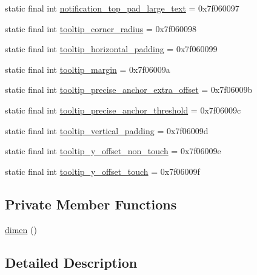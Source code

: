 \begin{DoxyCompactItemize}
\item 
static final int \mbox{\hyperlink{classandroid_1_1support_1_1design_1_1_r_1_1dimen_ae304902fc92fe38e50921433885f488b}{notification\+\_\+top\+\_\+pad\+\_\+large\+\_\+text}} = 0x7f060097
\item 
static final int \mbox{\hyperlink{classandroid_1_1support_1_1design_1_1_r_1_1dimen_a820af68fce1d51144ee651d2b4745161}{tooltip\+\_\+corner\+\_\+radius}} = 0x7f060098
\item 
static final int \mbox{\hyperlink{classandroid_1_1support_1_1design_1_1_r_1_1dimen_a2d5d1251e5fb4877c055140780ccf655}{tooltip\+\_\+horizontal\+\_\+padding}} = 0x7f060099
\item 
static final int \mbox{\hyperlink{classandroid_1_1support_1_1design_1_1_r_1_1dimen_a455cff6e6f3708ce927b07b2aa8fa4b3}{tooltip\+\_\+margin}} = 0x7f06009a
\item 
static final int \mbox{\hyperlink{classandroid_1_1support_1_1design_1_1_r_1_1dimen_acf04ff79f1e43192eb04a03f12ee7473}{tooltip\+\_\+precise\+\_\+anchor\+\_\+extra\+\_\+offset}} = 0x7f06009b
\item 
static final int \mbox{\hyperlink{classandroid_1_1support_1_1design_1_1_r_1_1dimen_aacffb6610eeb24579fd9d349eb839252}{tooltip\+\_\+precise\+\_\+anchor\+\_\+threshold}} = 0x7f06009c
\item 
static final int \mbox{\hyperlink{classandroid_1_1support_1_1design_1_1_r_1_1dimen_a2d61059ec36a5c4f85dd65a2d2a4c4ad}{tooltip\+\_\+vertical\+\_\+padding}} = 0x7f06009d
\item 
static final int \mbox{\hyperlink{classandroid_1_1support_1_1design_1_1_r_1_1dimen_a4240fd5708c2da5d2eb045a23cf0b2a7}{tooltip\+\_\+y\+\_\+offset\+\_\+non\+\_\+touch}} = 0x7f06009e
\item 
static final int \mbox{\hyperlink{classandroid_1_1support_1_1design_1_1_r_1_1dimen_a7e9207470a7236ed6fade4180fc9eeab}{tooltip\+\_\+y\+\_\+offset\+\_\+touch}} = 0x7f06009f
\end{DoxyCompactItemize}
\subsection*{Private Member Functions}
\begin{DoxyCompactItemize}
\item 
\mbox{\hyperlink{classandroid_1_1support_1_1design_1_1_r_1_1dimen_a743b37c664763c6d5e16c437a0c551c5}{dimen}} ()
\end{DoxyCompactItemize}


\subsection{Detailed Description}


